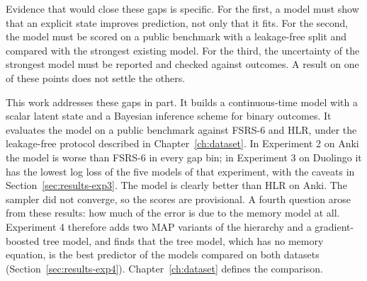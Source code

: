 Evidence that would close these gaps is specific. For the first, a model must show that an explicit state
improves prediction, not only that it fits. For the second, the model must be scored on a public benchmark
with a leakage-free split and compared with the strongest existing model. For the third, the uncertainty of
the strongest model must be reported and checked against outcomes. A result on one of these points does not
settle the others.

This work addresses these gaps in part. It builds a continuous-time model with a scalar latent state and a
Bayesian inference scheme for binary outcomes. It evaluates the model on a public benchmark against FSRS-6 and
HLR, under the leakage-free protocol described in Chapter~\ref{ch:dataset}. In Experiment 2 on Anki the model is worse than
FSRS-6 in every gap bin; in Experiment 3 on Duolingo it has the lowest log loss of the five models of that experiment, with the caveats in Section~\ref{sec:results-exp3}. The model is clearly better than HLR on Anki.
The sampler did not converge, so the scores are provisional. A fourth question arose from these results: how much of the
error is due to the memory model at all. Experiment 4 therefore adds two MAP variants of the hierarchy and a gradient-boosted tree
model, and finds that the tree model, which has no memory equation, is the best predictor of the models compared on both datasets (Section~\ref{sec:results-exp4}). Chapter~\ref{ch:dataset} defines the comparison.

